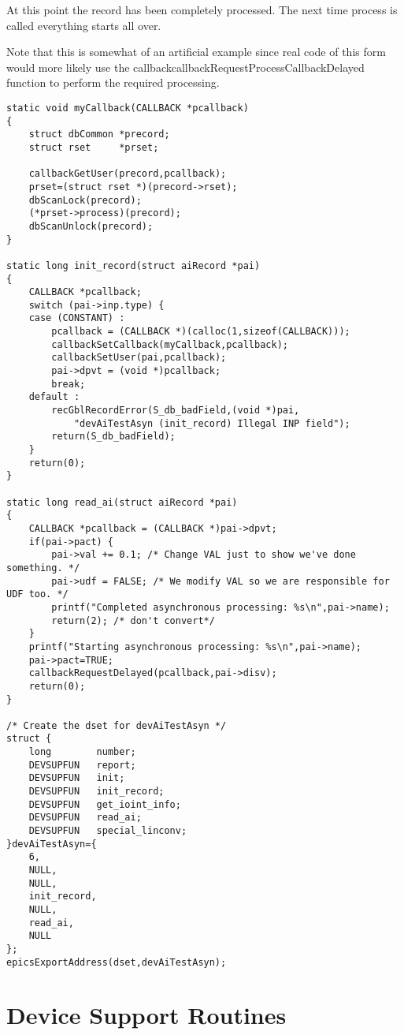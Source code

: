 At this point the record has been completely processed. The next time process is called everything starts all over.

Note that this is somewhat of an artificial example since real code of this form would more likely use the 
callbackcallbackRequestProcessCallbackDelayed function to perform the required processing.

\begin{verbatim}
static void myCallback(CALLBACK *pcallback)
{
    struct dbCommon *precord;
    struct rset     *prset;

    callbackGetUser(precord,pcallback);
    prset=(struct rset *)(precord->rset);
    dbScanLock(precord);
    (*prset->process)(precord);
    dbScanUnlock(precord);
}

static long init_record(struct aiRecord *pai)
{
    CALLBACK *pcallback;
    switch (pai->inp.type) {
    case (CONSTANT) :
        pcallback = (CALLBACK *)(calloc(1,sizeof(CALLBACK)));
        callbackSetCallback(myCallback,pcallback);
        callbackSetUser(pai,pcallback);
        pai->dpvt = (void *)pcallback;
        break;
    default :
        recGblRecordError(S_db_badField,(void *)pai,
            "devAiTestAsyn (init_record) Illegal INP field");
        return(S_db_badField);
    }
    return(0);
}

static long read_ai(struct aiRecord *pai)
{
    CALLBACK *pcallback = (CALLBACK *)pai->dpvt;
    if(pai->pact) {
        pai->val += 0.1; /* Change VAL just to show we've done something. */
        pai->udf = FALSE; /* We modify VAL so we are responsible for UDF too. */
        printf("Completed asynchronous processing: %s\n",pai->name);
        return(2); /* don't convert*/
    } 
    printf("Starting asynchronous processing: %s\n",pai->name);
    pai->pact=TRUE;
    callbackRequestDelayed(pcallback,pai->disv);
    return(0);
}

/* Create the dset for devAiTestAsyn */
struct {
    long        number;
    DEVSUPFUN   report;
    DEVSUPFUN   init;
    DEVSUPFUN   init_record;
    DEVSUPFUN   get_ioint_info;
    DEVSUPFUN   read_ai;
    DEVSUPFUN   special_linconv;
}devAiTestAsyn={
    6,
    NULL,
    NULL,
    init_record,
    NULL,
    read_ai,
    NULL
};
epicsExportAddress(dset,devAiTestAsyn);
\end{verbatim}

\section{Device Support Routines}

